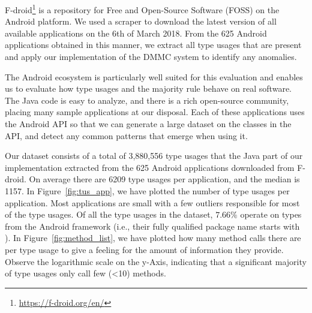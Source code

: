 F-droid\footnote{\url{https://f-droid.org/en/}} is a repository for Free and Open-Source Software (FOSS) on the Android platform.
We used a scraper to download the latest version of all available applications on the 6th of March 2018.
From the 625 Android applications obtained in this manner, we extract all type usages that are present and apply our implementation of the $\text{DMMC}$ system to identify any anomalies.

The Android ecosystem is particularly well suited for this evaluation and enables us to evaluate how type usages and the majority rule behave on real software.
The Java code is easy to analyze, and there is a rich open-source community, placing many sample applications at our disposal.
Each of these applications uses the Android API so that we can generate a large dataset on the classes in the API, and detect any common patterns that emerge when using it.

Our dataset consists of a total of 3,880,556 type usages that the Java part of our implementation extracted from the 625 Android applications downloaded from F-droid.
On average there are 6209 type usages per application, and the median is 1157.
In Figure~\ref{fig:tus_app}, we have plotted the number of type usages per application.
Most applications are small with a few outliers responsible for most of the type usages.
Of all the type usages in the dataset, $7.66\%$ operate on types from the Android framework (i.e., their fully qualified package name starts with ).
In Figure~\ref{fig:method_list}, we have plotted how many method calls there are per type usage to give a feeling for the amount of information they provide.
Observe the logarithmic scale on the y-Axis, indicating that a significant majority of type usages only call few (<10) methods.

